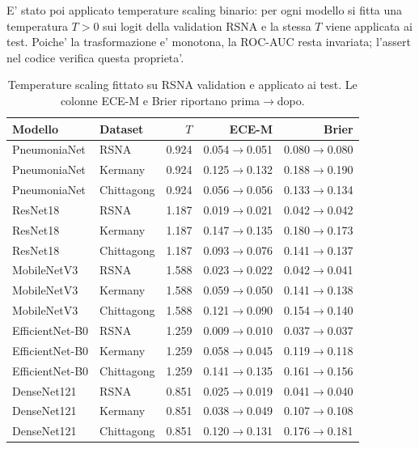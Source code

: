 \documentclass[11pt,a4paper]{article}
\begin{document}
E' stato poi applicato temperature scaling binario: per ogni modello si fitta
una temperatura \(T>0\) sui logit della validation RSNA e la stessa \(T\) viene
applicata ai test. Poiche' la trasformazione e' monotona, la ROC-AUC resta
invariata; l'assert nel codice verifica questa proprieta'.

\begin{table}[H]
\centering
\caption{Temperature scaling fittato su RSNA validation e applicato ai test. Le colonne ECE-M e Brier riportano prima$\rightarrow$dopo.}
\label{tab:temperature-scaling}
\small
\begin{tabular}{llrrr}
\toprule
Modello & Dataset & \(T\) & ECE-M & Brier \\
\midrule
PneumoniaNet & RSNA & 0.924 & 0.054$\rightarrow$0.051 & 0.080$\rightarrow$0.080 \\
PneumoniaNet & Kermany & 0.924 & 0.125$\rightarrow$0.132 & 0.188$\rightarrow$0.190 \\
PneumoniaNet & Chittagong & 0.924 & 0.056$\rightarrow$0.056 & 0.133$\rightarrow$0.134 \\
ResNet18 & RSNA & 1.187 & 0.019$\rightarrow$0.021 & 0.042$\rightarrow$0.042 \\
ResNet18 & Kermany & 1.187 & 0.147$\rightarrow$0.135 & 0.180$\rightarrow$0.173 \\
ResNet18 & Chittagong & 1.187 & 0.093$\rightarrow$0.076 & 0.141$\rightarrow$0.137 \\
MobileNetV3 & RSNA & 1.588 & 0.023$\rightarrow$0.022 & 0.042$\rightarrow$0.041 \\
MobileNetV3 & Kermany & 1.588 & 0.059$\rightarrow$0.050 & 0.141$\rightarrow$0.138 \\
MobileNetV3 & Chittagong & 1.588 & 0.121$\rightarrow$0.090 & 0.154$\rightarrow$0.140 \\
EfficientNet-B0 & RSNA & 1.259 & 0.009$\rightarrow$0.010 & 0.037$\rightarrow$0.037 \\
EfficientNet-B0 & Kermany & 1.259 & 0.058$\rightarrow$0.045 & 0.119$\rightarrow$0.118 \\
EfficientNet-B0 & Chittagong & 1.259 & 0.141$\rightarrow$0.135 & 0.161$\rightarrow$0.156 \\
DenseNet121 & RSNA & 0.851 & 0.025$\rightarrow$0.019 & 0.041$\rightarrow$0.040 \\
DenseNet121 & Kermany & 0.851 & 0.038$\rightarrow$0.049 & 0.107$\rightarrow$0.108 \\
DenseNet121 & Chittagong & 0.851 & 0.120$\rightarrow$0.131 & 0.176$\rightarrow$0.181 \\
\bottomrule
\end{tabular}
\normalsize
\end{table}
\end{document}

